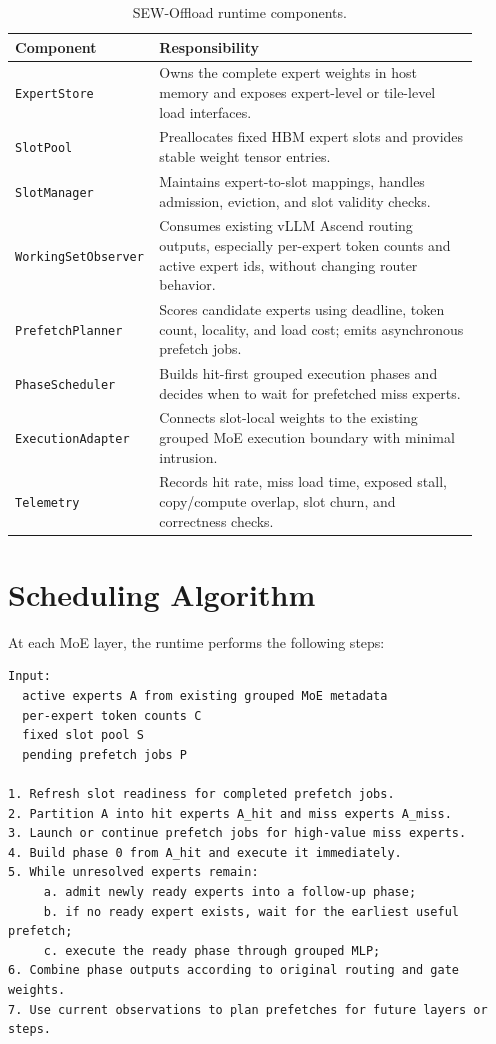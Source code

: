 \documentclass[10pt]{article}
\begin{document}
\begin{table}[h]
\centering
\small
\begin{tabular}{p{0.24\linewidth}p{0.68\linewidth}}
\toprule
Component & Responsibility \\
\midrule
\texttt{ExpertStore} &
Owns the complete expert weights in host memory and exposes expert-level or
tile-level load interfaces. \\
\texttt{SlotPool} &
Preallocates fixed HBM expert slots and provides stable weight tensor entries. \\
\texttt{SlotManager} &
Maintains expert-to-slot mappings, handles admission, eviction, and slot
validity checks. \\
\texttt{WorkingSetObserver} &
Consumes existing vLLM Ascend routing outputs, especially per-expert token
counts and active expert ids, without changing router behavior. \\
\texttt{PrefetchPlanner} &
Scores candidate experts using deadline, token count, locality, and load cost;
emits asynchronous prefetch jobs. \\
\texttt{PhaseScheduler} &
Builds hit-first grouped execution phases and decides when to wait for
prefetched miss experts. \\
\texttt{ExecutionAdapter} &
Connects slot-local weights to the existing grouped MoE execution boundary with
minimal intrusion. \\
\texttt{Telemetry} &
Records hit rate, miss load time, exposed stall, copy/compute overlap, slot
churn, and correctness checks. \\
\bottomrule
\end{tabular}
\caption{SEW-Offload runtime components.}
\label{tab:components}
\end{table}

\section{Scheduling Algorithm}

At each MoE layer, the runtime performs the following steps:

\begin{verbatim}
Input:
  active experts A from existing grouped MoE metadata
  per-expert token counts C
  fixed slot pool S
  pending prefetch jobs P

1. Refresh slot readiness for completed prefetch jobs.
2. Partition A into hit experts A_hit and miss experts A_miss.
3. Launch or continue prefetch jobs for high-value miss experts.
4. Build phase 0 from A_hit and execute it immediately.
5. While unresolved experts remain:
     a. admit newly ready experts into a follow-up phase;
     b. if no ready expert exists, wait for the earliest useful prefetch;
     c. execute the ready phase through grouped MLP;
6. Combine phase outputs according to original routing and gate weights.
7. Use current observations to plan prefetches for future layers or steps.
\end{verbatim}
\end{document}
